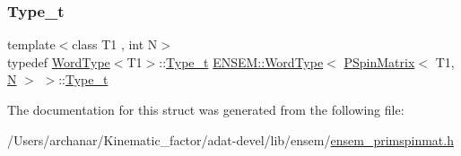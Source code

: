 \subsubsection{\texorpdfstring{Type\_t}{Type\_t}\hspace{0.1cm}{\footnotesize\ttfamily [3/3]}}
{\footnotesize\ttfamily template$<$class T1 , int N$>$ \\
typedef \mbox{\hyperlink{structENSEM_1_1WordType}{Word\+Type}}$<$T1$>$\+::\mbox{\hyperlink{structENSEM_1_1WordType_3_01PSpinMatrix_3_01T1_00_01N_01_4_01_4_a497367a5083738a899e7e09e43127eec}{Type\+\_\+t}} \mbox{\hyperlink{structENSEM_1_1WordType}{E\+N\+S\+E\+M\+::\+Word\+Type}}$<$ \mbox{\hyperlink{classENSEM_1_1PSpinMatrix}{P\+Spin\+Matrix}}$<$ T1, \mbox{\hyperlink{adat__devel_2lib_2hadron_2operator__name__util_8cc_a7722c8ecbb62d99aee7ce68b1752f337}{N}} $>$ $>$\+::\mbox{\hyperlink{structENSEM_1_1WordType_3_01PSpinMatrix_3_01T1_00_01N_01_4_01_4_a497367a5083738a899e7e09e43127eec}{Type\+\_\+t}}}



The documentation for this struct was generated from the following file\+:\begin{DoxyCompactItemize}
\item 
/\+Users/archanar/\+Kinematic\+\_\+factor/adat-\/devel/lib/ensem/\mbox{\hyperlink{adat-devel_2lib_2ensem_2ensem__primspinmat_8h}{ensem\+\_\+primspinmat.\+h}}\end{DoxyCompactItemize}
